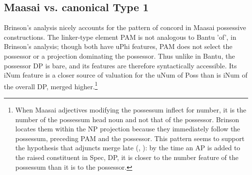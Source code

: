 \documentclass[output=paper
,modfonts
,nonflat]{langsci/langscibook}
\begin{document}
\begin{figure}[!h]
	\begin{exe}
	\end{exe}
\end{figure}
\newpage\noindent
\subsection{Maasai vs. canonical Type 1}
Brinson's analysis nicely accounts for the pattern of concord in Maasai possessive constructions. The linker-type element PAM is not analogous to Bantu 'of', in Brinson's analysis; though both have uPhi features, PAM does not select the possessor or a projection dominating the possessor. Thus unlike in Bantu, the possessor DP is bare, and its features are therefore syntactically accessible. Its iNum feature is a closer source of valuation for the uNum of Poss than is iNum of the overall DP, merged higher.\footnote{When Maasai adjectives modifying the possessum inflect for number, it is the number of the possessum head noun and not that of the possessor. Brinson locates them within the NP projection because they immediately follow the possessum, preceding PAM and the possessor. This pattern seems to support the hypothesis that adjuncts merge late (\citealt{Lebeaux1988}, \citealt{Chomsky1993}): by the time an AP is added to the raised constituent in Spec, DP, it is closer to the number feature of the possessum than it is to the possessor.} \textsuperscript{}  
\end{document}
